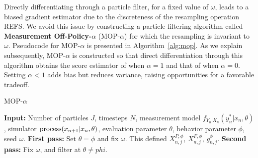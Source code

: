 \documentclass[9pt,twocolumn,twoside]{pnas-new}
\begin{document}
Directly differentiating through a particle filter, for a fixed value of $\omega$, leads to a biased gradient estimator due to the discreteness of the resampling operation REFS.
We avoid this issue by constructing a particle filtering algorithm called \textbf{Measurement Off-Policy-$\alpha$} (MOP-$\alpha$) for which the resampling is invariant to $\omega$.
Pseudocode for MOP-$\alpha$ is presented in Algorithm~\ref{alg:mop}.
As we explain subsequently, MOP-$\alpha$ is constructed so that direct differentiation through this algorithm obtains the score estimator of  \cite{poyiadjis11, scibior21} when $\alpha=1$ and that of \cite{naesseth18} when $\alpha=0$.
Setting $\alpha<1$ adds bias but reduces variance, raising opportunities for a favorable tradeoff.

\begin{algorithm}[H]
	\caption{MOP-$\alpha$}
    \label{alg:mop}
	     \textbf{Input:} Number of particles $J$, timesteps $N$, measurement model $f_{Y_n|X_n}(y_n^*|x_n, \theta)$, simulator $\text{process}(x_{n+1}|x_n, \theta)$, evaluation parameter $\theta$, behavior parameter $\phi$, seed $\omega$. \newline
            \textbf{First pass:} Set $\theta=\phi$ and fix $\omega$. This defined $X_{n,j}^{P,\phi}$, $X_{n,j}^{F,\phi}$, $g^{\phi}_{n,j}$. \newline
        \textbf{Second pass:}
            Fix $\omega$, and filter at $\theta\neq phi$. \newline
            

\end{algorithm}
\end{document}
